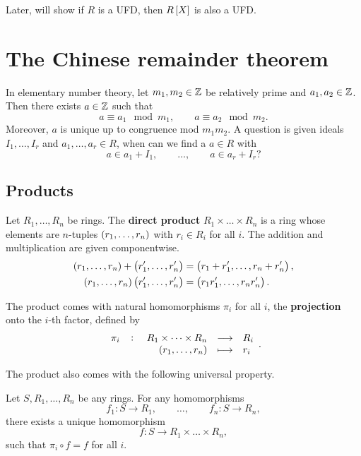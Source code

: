 Later, will show if $ R $ is a UFD, then $ R\sbr{X} $ is also a UFD.

\pagebreak

\section{The Chinese remainder theorem}

In elementary number theory, let $ m_1, m_2 \in \mathbb{Z} $ be relatively prime and $ a_1, a_2 \in \mathbb{Z} $. Then there exists $ a \in \mathbb{Z} $ such that
$$ a \equiv a_1 \mod m_1, \qquad a \equiv a_2 \mod m_2. $$
Moreover, $ a $ is unique up to congruence mod $ m_1m_2 $. A question is given ideals $ I_1, \dots, I_r $ and $ a_1, \dots, a_r \in R $, when can we find a $ a \in R $ with
$$ a \in a_1 + I_1, \qquad \dots, \qquad a \in a_r + I_r? $$

\subsection{Products}

\begin{definition}
Let $ R_1, \dots, R_n $ be rings. The \textbf{direct product} $ R_1 \times \dots \times R_n $ is a ring whose elements are $ n $-tuples $ \br{r_1, \dots, r_n} $ with $ r_i \in R_i $ for all $ i $. The addition and multiplication are given componentwise.
\begin{align*}
\br{r_1, \dots, r_n} + \br{r_1', \dots, r_n'} & = \br{r_1 + r_1', \dots, r_n + r_n'}, \\
\br{r_1, \dots, r_n}\br{r_1', \dots, r_n'} & = \br{r_1r_1', \dots, r_nr_n'}.
\end{align*}
\end{definition}

\begin{note*}
The product comes with natural homomorphisms $ \pi_i $ for all $ i $, the \textbf{projection} onto the $ i $-th factor, defined by
$$ \function[\pi_i]{R_1 \times \dots \times R_n}{R_i}{\br{r_1, \dots, r_n}}{r_i}. $$
\end{note*}

The product also comes with the following universal property.

\begin{theorem}
Let $ S, R_1, \dots, R_n $ be any rings. For any homomorphisms
$$ f_1 : S \to R_1, \qquad \dots, \qquad f_n : S \to R_n, $$
there exists a unique homomorphism
$$ f : S \to R_1 \times \dots \times R_n, $$
such that $ \pi_i \circ f = f $ for all $ i $.
\end{theorem}

